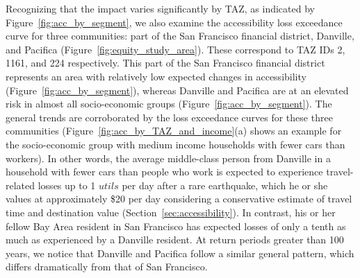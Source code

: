 Recognizing that the impact varies significantly by TAZ, as indicated by Figure~\ref{fig:acc_by_segment},
we also examine the accessibility loss exceedance curve for three communities: part of the San Francisco financial district, Danville, and Pacifica (Figure~\ref{fig:equity_study_area}). These correspond to TAZ IDs 2, 1161, and 224 respectively. This part of the San Francisco financial district  represents an area with relatively low expected changes in accessibility (Figure~\ref{fig:acc_by_segment}), whereas Danville and Pacifica are at an elevated risk in almost all socio-economic groups (Figure~\ref{fig:acc_by_segment}). 
The general trends are corroborated by the loss exceedance curves for these three communities (Figure~\ref{fig:acc_by_TAZ_and_income}{(a)} shows an example for the socio-economic group with medium income households with fewer cars than workers). In other words, the average middle-class person from Danville in a household with fewer cars than people who work is expected to experience travel-related losses up to 1 $utils$ per day after a rare earthquake, which he or she values at approximately \$20 per day considering a conservative estimate of travel time and destination value (Section~\ref{sec:accessibility}). In contrast, his or her fellow Bay Area resident in San Francisco has expected losses of only a tenth as much as experienced by a Danville resident. At return periods greater than 100 years, we notice that Danville and Pacifica follow a similar general pattern, which differs dramatically from that of San Francisco. 

